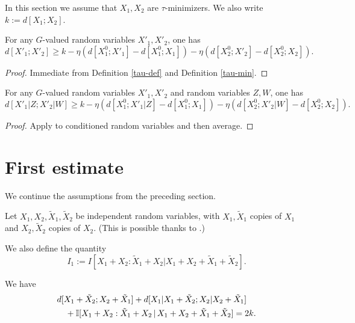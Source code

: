 In this section we assume that $X_1,X_2$ are $\tau$-minimizers. We also write $k := d[X_1;X_2]$.

\begin{lemma}\label{distance-lower}
  \leanok
  For any $G$-valued random variables $X'_1,X'_2$, one has
$$ d[X'_1;X'_2] \geq k - \eta (d[X^0_1;X'_1] - d[X^0_1;X_1] ) - \eta (d[X^0_2;X'_2] - d[X^0_2;X_2] ).$$
\end{lemma}

\begin{proof}
  \leanok
  Immediate from Definition \ref{tau-def} and Definition \ref{tau-min}.
\end{proof}

\begin{lemma}\label{cond-distance-lower}
  \leanok
  For any $G$-valued random variables $X'_1,X'_2$ and random variables $Z,W$, one has
$$ d[X'_1|Z;X'_2|W] \geq k - \eta (d[X^0_1;X'_1|Z] - d[X^0_1;X_1] ) - \eta (d[X^0_2;X'_2|W] - d[X^0_2;X_2] ).$$
\end{lemma}

\begin{proof}\leanok  Apply  to conditioned random variables and then average.
\end{proof}

\section{First estimate}

We continue the assumptions from the preceding section.

Let $X_1, X_2, \tilde X_1, \tilde X_2$ be independent random variables, with $X_1,\tilde X_1$ copies of $X_1$ and $X_2,\tilde X_2$ copies of $X_2$.  (This is possible thanks to .)

We also define the quantity
$$ I_1 :=  I [X_1+X_2 : \tilde X_1 + X_2 | X_1+X_2+\tilde X_1+\tilde X_2].$$

\begin{lemma}\label{first-fibre}
  \leanok
  We have
  \begin{align*}
    &   d[X_1+\tilde X_2;X_2+\tilde X_1] + d[X_1|X_1+\tilde X_2; X_2|X_2+\tilde X_1] \\
    &\quad + \mathbb{I}[X_1+ X_2 : \tilde X_1 + X_2 \,|\, X_1 + X_2 + \tilde X_1 + \tilde X_2] = 2k.
  \end{align*}
\end{lemma}

